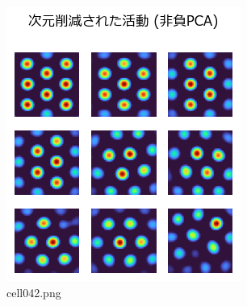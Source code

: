 \begin{figure}[ht]
	\centering
	\includegraphics[scale=0.8, max width=\linewidth]{./fig/local-learning-rule/pca-hebbian-learning/cell042.png}
	\caption{cell042.png}
	\label{cell042.png}
\end{figure}